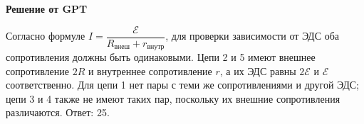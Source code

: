 \documentclass[12pt,a4paper]{article}
\begin{document}
{\begin{center}
\end{center}
}{
\smallskip\noindent\textbf{Решение от GPT}\par
Согласно формуле $I=\dfrac{\mathcal{E}}{R_{\text{внеш}}+r_{\text{внутр}}}$, для проверки зависимости от ЭДС оба сопротивления должны быть одинаковыми. Цепи 2 и 5 имеют внешнее сопротивление $2R$ и внутреннее сопротивление $r$, а их ЭДС равны $2\mathcal{E}$ и $\mathcal{E}$ соответственно. Для цепи 1 нет пары с теми же сопротивлениями и другой ЭДС; цепи 3 и 4 также не имеют таких пар, поскольку их внешние сопротивления различаются. Ответ: 25.
}
\end{document}
